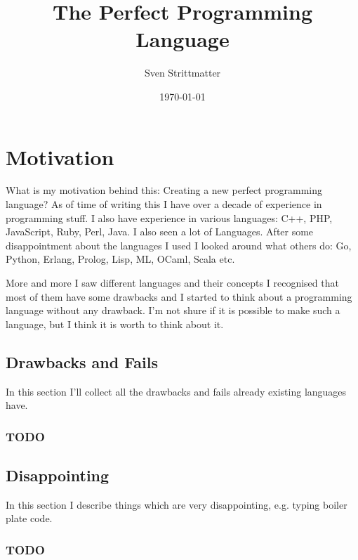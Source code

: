 \documentclass[a4paper,12pt]{article}
\title{The Perfect Programming Language}
\author{Sven Strittmatter}
\date{\today}
\begin{document}
\maketitle
{}
\newpage

\tableofcontents
\newpage

\section{Motivation}

What is my motivation behind this: Creating a new perfect programming language? As of time of writing this I have over a decade of experience in programming stuff. I also have experience in various languages: C++, PHP, JavaScript, Ruby, Perl, Java. I also seen a lot of Languages. After some disappointment about the languages I used I looked around what others do: Go, Python, Erlang, Prolog, Lisp, ML, OCaml, Scala etc.

More and more I saw different languages and their concepts I recognised that most of them have some drawbacks and I started to think about a programming language without any drawback. I'm not shure if it is possible to make such a language, but I think it is worth to think about it.

\subsection{Drawbacks and Fails}

In this section I'll collect all the drawbacks and fails already existing languages have.

\subsubsection{TODO}

\subsection*{Disappointing}

In this section I describe things which are very disappointing, e.g. typing boiler plate code.

\subsubsection{TODO}
\end{document}
